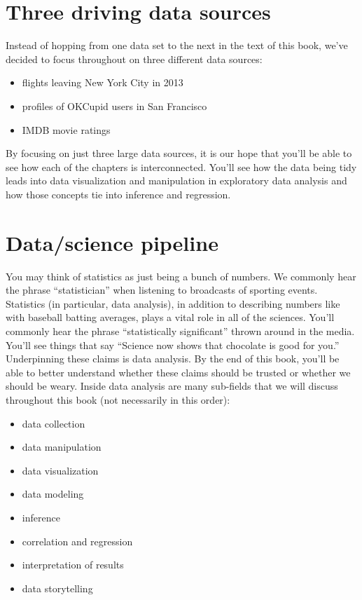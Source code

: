 \documentclass[]{tufte-book}
\providecommand{\tightlist}{%
  \setlength{\itemsep}{0pt}\setlength{\parskip}{0pt}}
\begin{document}
\section{Three driving data sources}\label{three-driving-data-sources}

Instead of hopping from one data set to the next in the text of this
book, we've decided to focus throughout on three different data sources:

\begin{itemize}
\tightlist
\item
  flights leaving New York City in 2013
\item
  profiles of OKCupid users in San Francisco
\item
  IMDB movie ratings
\end{itemize}

By focusing on just three large data sources, it is our hope that you'll
be able to see how each of the chapters is interconnected. You'll see
how the data being tidy leads into data visualization and manipulation
in exploratory data analysis and how those concepts tie into inference
and regression.

\section{Data/science pipeline}\label{datascience-pipeline}

You may think of statistics as just being a bunch of numbers. We
commonly hear the phrase ``statistician'' when listening to broadcasts
of sporting events. Statistics (in particular, data analysis), in
addition to describing numbers like with baseball batting averages,
plays a vital role in all of the sciences. You'll commonly hear the
phrase ``statistically significant'' thrown around in the media. You'll
see things that say ``Science now shows that chocolate is good for
you.'' Underpinning these claims is data analysis. By the end of this
book, you'll be able to better understand whether these claims should be
trusted or whether we should be weary. Inside data analysis are many
sub-fields that we will discuss throughout this book (not necessarily in
this order):

\begin{itemize}
\tightlist
\item
  data collection
\item
  data manipulation
\item
  data visualization
\item
  data modeling
\item
  inference
\item
  correlation and regression
\item
  interpretation of results
\item
  data storytelling
\end{itemize}
\end{document}
